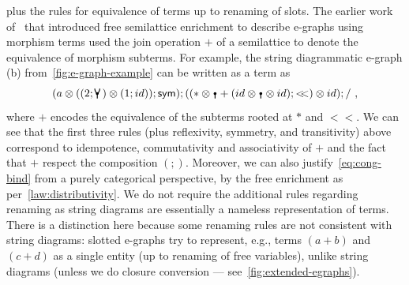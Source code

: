 	plus the rules for equivalence of terms up to renaming of slots.
	The earlier work of~\citet{tiurin2025equivalencehypergraphsdporewriting} that introduced free semilattice enrichment to describe e-graphs using morphism terms used the join operation $+$ of a semilattice to denote the equivalence of morphism subterms.
	For example, the string diagrammatic e-graph (b) from~\autoref{fig:e-graph-example} can be written as a term as
	\[(a \otimes ((2;\comonoid) \otimes (1;id));\sym);((* \otimes \counit + (id \otimes \counit \otimes id);<\!\!<) \otimes id);/~,\] where $+$ encodes the equivalence of the subterms rooted at $*$ and $<\!\!<$.
	We can see that the first three rules (plus reflexivity, symmetry, and transitivity) above correspond to idempotence, commutativity and associativity of $+$ and the fact that $+$ respect the composition $(;)$.
	Moreover, we can also justify~\autoref{eq:cong-bind} from a purely categorical perspective, by the free enrichment as per~\autoref{law:distributivity}.
	We do not require the additional rules regarding renaming as string diagrams are essentially a nameless representation of terms.
	There is a distinction here because some renaming rules are not consistent with string diagrams: slotted e-graphs try to represent, e.g., terms $(a + b)$ and $(c + d)$ as a single entity (up to renaming of free variables), unlike string diagrams (unless we do closure conversion --- see~\autoref{fig:extended-egraphs}).


